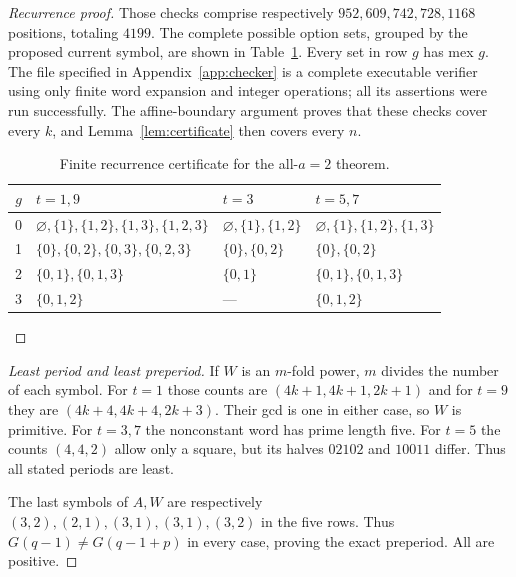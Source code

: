 \documentclass[11pt]{article}
\theoremstyle{remark}\newtheorem{remark}[theorem]{Remark}
\begin{document}
\begin{proof}[Recurrence proof]
Those checks comprise respectively $952,609,742,728,1168$ positions, totaling $4199$. The complete possible option sets, grouped by the proposed current symbol, are shown in Table~\ref{tab:sets}. Every set in row $g$ has mex $g$. The file specified in Appendix~\ref{app:checker} is a complete executable verifier using only finite word expansion and integer operations; all its assertions were run successfully. The affine-boundary argument proves that these checks cover every $k$, and Lemma~\ref{lem:certificate} then covers every $n$.
\begin{table}[ht]\centering\scriptsize
\begin{tabular}{c|l|l|l}\toprule
$g$&$t=1,9$&$t=3$&$t=5,7$\\\midrule
0&$\varnothing,\{1\},\{1,2\},\{1,3\},\{1,2,3\}$&$\varnothing,\{1\},\{1,2\}$&$\varnothing,\{1\},\{1,2\},\{1,3\}$\\
1&$\{0\},\{0,2\},\{0,3\},\{0,2,3\}$&$\{0\},\{0,2\}$&$\{0\},\{0,2\}$\\
2&$\{0,1\},\{0,1,3\}$&$\{0,1\}$&$\{0,1\},\{0,1,3\}$\\
3&$\{0,1,2\}$&---&$\{0,1,2\}$\\\bottomrule
\end{tabular}
\caption{Finite recurrence certificate for the all-$a=2$ theorem.}\label{tab:sets}
\end{table}
\end{proof}

\begin{proof}[Least period and least preperiod]
If $W$ is an $m$-fold power, $m$ divides the number of each symbol. For $t=1$ those counts are $(4k+1,4k+1,2k+1)$ and for $t=9$ they are $(4k+4,4k+4,2k+3)$. Their gcd is one in either case, so $W$ is primitive. For $t=3,7$ the nonconstant word has prime length five. For $t=5$ the counts $(4,4,2)$ allow only a square, but its halves $02102$ and $10011$ differ. Thus all stated periods are least.

The last symbols of $A,W$ are respectively $(3,2),(2,1),(3,1),(3,1),(3,2)$ in the five rows. Thus $G(q-1)\ne G(q-1+p)$ in every case, proving the exact preperiod. All are positive.
\end{proof}
\end{document}
